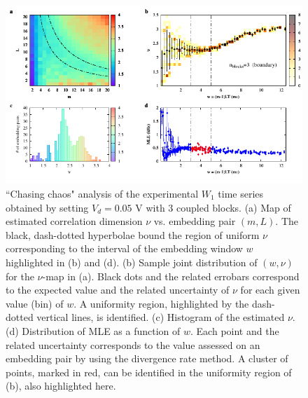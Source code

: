 
\begin{figure}[H]
    \centering
    \includegraphics[width=\linewidth]{../blocks/3_blocks/edge/2e5_points/plots/chaos_low.pdf}
    \caption{``Chasing chaos" analysis of the experimental $W_1$ time series obtained by setting $V_d=0.05$ V with 3 coupled blocks.
    (a) Map of estimated correlation dimension $\nu$ vs. embedding pair $(m, L)$.
    The black, dash-dotted hyperbolae bound the region of uniform $\nu$ corresponding to the interval of the
    embedding window $w$ highlighted in (b) and (d).
    (b) Sample joint distribution of $(w,\nu)$ for the $\nu$-map in (a).
    Black dots and the related errobars correspond to the expected value and the related uncertainty of $\nu$
    for each given value (bin) of $w$. A uniformity region, highlighted by the dash-dotted vertical lines,
    is identified. (c) Histogram of the estimated $\nu$. (d) Distribution of MLE as a function of $w$. Each point and the related
    uncertainty corresponds to the value assessed on an embedding pair by using the divergence rate method.
    A cluster of points, marked in red, can be identified in the uniformity region of (b), also highlighted here.}
    \label{fig:3 blocks chaos}
\end{figure}

